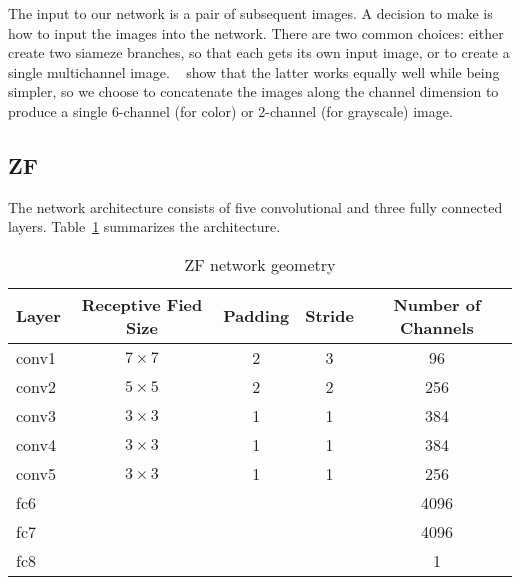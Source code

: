 The input to our network is a pair of subsequent images.  A decision
to make is how to input the images into the network.  There are two
common choices: either create two siameze branches, so that each gets
its own input image, or to create a single multichannel image.
~\cite{fischer2015flownet} show that the latter works equally well
while being simpler, so we choose to concatenate the images along the
channel dimension to produce a single 6-channel (for color) or
2-channel (for grayscale) image.

\subsection{ZF}

The network architecture consists of five convolutional and three fully connected layers.  Table~\ref{tab:zf_geometry} summarizes the architecture.

\begin{table}[ht]
  \begin{tabular}{lcccc}
    \toprule
    \textbf{Layer} & \textbf{Receptive Fied Size} & \textbf{Padding} & \textbf{Stride} & \textbf{Number of Channels}\\
    \midrule
    conv1&  $7\times 7$& 2& 3&   96\\
    conv2&  $5\times 5$& 2& 2&  256\\
    conv3&  $3\times 3$& 1& 1&  384\\
    conv4&  $3\times 3$& 1& 1&  384\\
    conv5&  $3\times 3$& 1& 1&  256\\
    fc6&               &  &  & 4096\\
    fc7&               &  &  & 4096\\
    fc8&               &  &  &    1\\
  \end{tabular}
  \caption{ZF network geometry}
  \label{tab:zf_geometry}
\end{table}

